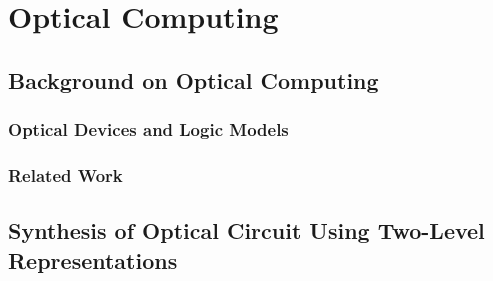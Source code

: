 \documentclass[10pt,letterpaper,twoside,openright]{book}
\begin{document}

\part{Optical Computing}
\chapter{Background on Optical Computing}

\section{Optical Devices and Logic Models}

\newpage

\section{Related Work}

\newpage


\chapter{Synthesis of Optical Circuit Using Two-Level Representations}~\label{ch:synth-two-level}
\end{document}
